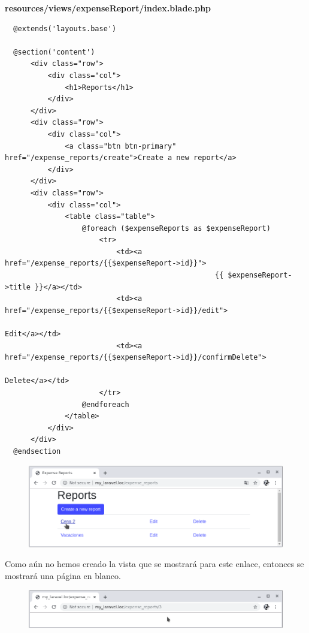 \documentclass{article}
\begin{document}
\textbf{resources/views/expenseReport/index.blade.php}
\begin{verbatim}
  @extends('layouts.base')

  @section('content')
      <div class="row">
          <div class="col">
              <h1>Reports</h1>
          </div>
      </div>
      <div class="row">
          <div class="col">
              <a class="btn btn-primary" href="/expense_reports/create">Create a new report</a>
          </div>
      </div>
      <div class="row">
          <div class="col">
              <table class="table">
                  @foreach ($expenseReports as $expenseReport)
                      <tr>
                          <td><a href="/expense_reports/{{$expenseReport->id}}">
                                                 {{ $expenseReport->title }}</a></td>
                          <td><a href="/expense_reports/{{$expenseReport->id}}/edit">
                                                                        Edit</a></td>
                          <td><a href="/expense_reports/{{$expenseReport->id}}/confirmDelete">
                                                                               Delete</a></td>
                      </tr>
                  @endforeach
              </table>
          </div>
      </div>
  @endsection
\end{verbatim}

\newpage

\begin{figure}[h!]
  \centering
  \includegraphics[scale=0.5]{./Pictures/095_reports_as_links.png}
\end{figure}

Como aún no hemos creado la vista que se mostrará para este enlace, entonces se
mostrará una página en blanco.

\begin{figure}[h!]
  \centering
  \includegraphics[scale=0.5]{./Pictures/096_blank_page.png}
\end{figure}
\end{document}
